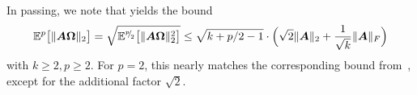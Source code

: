 In passing, we note that   yields the bound
    \begin{equation}
        \mathbb{E}^{p}\big[ \lVert \boldsymbol{A} \boldsymbol{\Omega} \rVert _2 \big] = \sqrt{\mathbb{E}^{{}^{p}{\mskip -5mu/\mskip -3mu}_{2}}\big[ \lVert \boldsymbol{A} \boldsymbol{\Omega} \rVert _2^2 \big]} \leq \sqrt{k + p/2-1} \cdot \Big(\sqrt{2} \lVert \boldsymbol{A} \rVert _2 + \frac{1}{\sqrt{k}}\lVert \boldsymbol{A} \rVert_F\Big)
    \end{equation}
    with $k\ge 2, p\ge 2$. For $p = 2$, this nearly matches the corresponding bound from~\cite[Lemma B.1]{tropp-2023-randomized-algorithms}, except for the additional factor $\sqrt{2}$.

\color{black}
%
%
%
